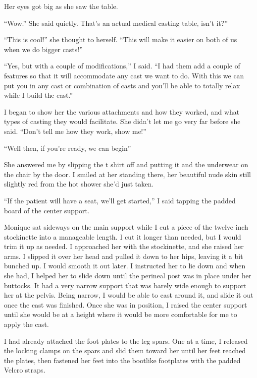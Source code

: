 Her eyes got big as she saw the table.

``Wow.'' She said quietly. That's an actual medical casting table, isn't it?''

\begin{thought}
``This is cool!'' she thought to herself. ``This will make it easier on both of us when we do
bigger casts!''
\end{thought}

``Yes, but with a couple of modifications,'' I said. ``I had them add a couple of features so
that it will accommodate any cast we want to do. With this we can put you in any cast or
combination of casts and you'll be able to totally relax while I build the cast.''

I began to show her the various attachments and how they worked, and what types of casting
they would facilitate. She didn't let me go very far before she said. ``Don't tell me how they
work, show me!''

``Well then, if you're ready, we can begin''

She answered me by slipping the t shirt off and putting it and the underwear on the chair
by the door. I smiled at her standing there, her beautiful nude skin still slightly red from the
hot shower she'd just taken.

``If the patient will have a seat, we'll get started,'' I said tapping the padded board of
the center support.

Monique sat sideways on the main support while I cut a piece of the twelve inch stockinette
into a manageable length. I cut it longer than needed, but I would trim it up as needed. I
approached her with the stockinette, and she raised her arms. I slipped it over her head and
pulled it down to her hips, leaving it a bit bunched up. I would smooth it out later. I
instructed her to lie down and when she had, I helped her to slide down until the perineal post
was in place under her buttocks. It had a very narrow support that was barely wide enough to
support her at the pelvis. Being narrow, I would be able to cast around it, and slide it out
once the cast was finished. Once she was in position, I raised the center support until she
would be at a height where it would be more comfortable for me to apply the cast.

I had already attached the foot plates to the leg spars. One at a time, I released the
locking clamps on the spars and slid them toward her until her feet reached the plates, then
fastened her feet into the bootlike footplates with the padded Velcro straps.

